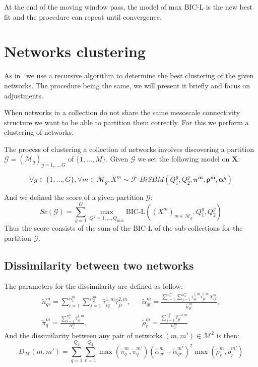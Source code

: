 \documentclass[12pt,a4paper]{report}
\begin{document}
At the end of the moving window pass, the model of max BIC-L is the new best
fit and the procedure can repeat until convergence.

\section{Networks clustering}
\label{sec:networks-clustering}
As in~\cite{chabert-liddellLearningCommonStructures2023} we use a recursive
algorithm to determine the best clustering of the given networks. The procedure
being the same, we will present it briefly and focus on adjustments.

When networks in a collection do not share the same mesoscale connectivity
structure we want to be able to partition them correctly. For this we perform
a clustering of networks.

The process of clustering a collection of networks involves discovering a
partition $\mathcal{G} = (\mathcal{M}_g)_{g=1,\dots,G}$ of $\{1,\dots, M\}$.
Given $\mathcal{G}$ we set the following model on $\bm{X}$:

\[
    \forall g \in \{1,\dots, G\}, \forall m \in \mathcal{M}_g, X^m \sim \mathcal{F}\text{-}BiSBM(Q_1^g, Q_2^g, \bm{\pi^m, \rho^m,} \bm{\alpha}^g)
\]

And we defined the score of a given partition $\mathcal{G}$:
\[
    Sc(\mathcal{G}) = \sum_{g=1}^{G} \max_{Q^g=1,\dots,Q_{\max}} \text{BIC-L}((X^m)_{m\in\mathcal{M}_g},Q_1^g, Q_2^g)
\]
Thus the score consists of the sum of the BIC-L of the sub-collections for the
partition $\mathcal{G}$.

\subsection{Dissimilarity between two networks}
\label{ssec:dissimilarity-between-two-networks}
The parameters for the dissimilarity are defined as follow:
\begin{align*}
    \widetilde{n}_{qr}^m = \sum_{i=1}^{n_1^m} \sum_{j=1}^{n_2^m} \widehat{\tau}_{iq}^{1,m} \widehat{\tau}_{jr}^{2,m},
    && \widetilde{\alpha}_{qr}^m = \frac{\sum_{i=1}^{n_1^m} \sum_{j=1}^{n_2^m} \widehat{\tau}_{iq}^{1,m} \widehat{\tau}_{jr}^{2,m} X_{ij}^m}{\widetilde{n}_{qr}^m},\\
    \widetilde{\pi}_q^m = \frac{\sum_{i=1}^{n_1^m} \widehat{\tau}_{iq}^{1,m}}{n_1^m},
    && \widetilde{\rho}_r^m = \frac{\sum_{j=1}^{n_2^m} \widehat{\tau_{jr}}^{2,m}}{n_2^m}
\end{align*}
And the dissimilarity between any pair of networks $(m,m')\in\mathcal{M}^2$ is then:
\[
    D_{\mathcal{M}}(m,m') = \sum_{q = 1}^{Q_1} \sum_{r = 1}^{Q_2} \max(\widetilde{\pi}_{q}^{m}, \widetilde{\pi}_{q}^{m'}) \left( \widetilde{\alpha}_{qr}^{m} - \widetilde{\alpha}_{qr}^{m'}\right)^{2} \max(\widetilde{\rho}_{r}^{m}, \widetilde{\rho}_{r}^{m'})
\]
\end{document}
